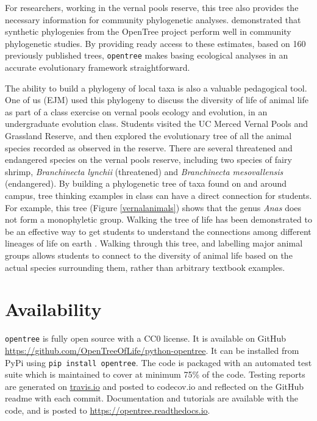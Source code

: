 \documentclass[oupdraft]{sysbio_sse}
\begin{document}
For researchers, working in the vernal pools reserve, this tree also provides the necessary information for community phylogenetic analyses. \citet{li_for_2019} demonstrated that synthetic phylogenies from the OpenTree project perform well in community phylogenetic studies. By providing ready access to these estimates, based on 160 previously published trees, \texttt{opentree} makes basing ecological analyses in an accurate evolutionary framework straightforward.


The ability to build a phylogeny of local taxa is also a valuable pedagogical tool. One of us (EJM) used this phylogeny to discuss the diversity of life of animal life as part of a class exercise on vernal pools ecology and evolution, in an undergraduate evolution class. 
Students visited the UC Merced Vernal Pools and Grassland Reserve, and then explored the evolutionary tree of all the animal species recorded as observed in the reserve. 
There are several threatened and endangered species on the vernal pools reserve, including two species of fairy shrimp, \textit{Branchinecta lynchii} (threatened) and \textit{Branchinecta mesovallensis} (endangered). 
By building a phylogenetic tree of taxa found on and around campus, tree thinking examples in class can have a direct connection for students. For example, this tree (Figure \ref{vernalanimals}) shows that the genus \textit{Anas} does not form a monophyletic group. Walking the tree of life has been demonstrated to be an effective way to get students to understand the connections among different lineages of life on earth \citep{ballen_walking_2017}. Walking through this tree, and labelling major animal groups allows students to connect to the diversity of animal life based on the actual species surrounding them, rather than arbitrary textbook examples.



\section{Availability}
\label{sec5}

\texttt{opentree} is fully open source with a CC0 license. It is available on GitHub \url{ https://github.com/OpenTreeOfLife/python-opentree}. It can be installed from PyPi using \texttt{pip install opentree}. The code is packaged with an automated test suite which is maintained to cover at minimum 75\% of the code. Testing reports are generated on \url{travis.io} and posted to {codecov.io} and reflected on the GitHub readme with each commit. Documentation and tutorials are available with the code, and is posted to \url{https://opentree.readthedocs.io}.
\end{document}
